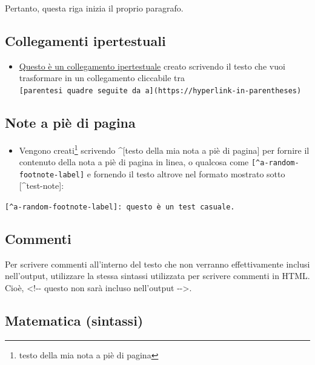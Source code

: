 \documentclass[a4paper, 11pt, nobind]{templates/ociamthesis}
\providecommand{\tightlist}{%
  \setlength{\itemsep}{0pt}\setlength{\parskip}{0pt}}
\begin{document}
Pertanto, questa riga inizia il proprio paragrafo.

\hypertarget{collegamenti-ipertestuali}{%
\subsection{Collegamenti ipertestuali}\label{collegamenti-ipertestuali}}

\begin{itemize}
\tightlist
\item
  \href{https://www.google.com}{Questo è un collegamento ipertestuale} creato scrivendo il testo che vuoi trasformare in un collegamento cliccabile tra \texttt{{[}parentesi\ quadre\ seguite\ da\ a{]}(https://hyperlink-in-parentheses)}
\end{itemize}

\hypertarget{note-a-piuxe8-di-pagina}{%
\subsection{Note a piè di pagina}\label{note-a-piuxe8-di-pagina}}

\begin{itemize}
\tightlist
\item
  Vengono creati\footnote{testo della mia nota a piè di pagina} scrivendo \^{}{[}testo della mia nota a piè di pagina{]} per fornire il contenuto della nota a piè di pagina in linea, o qualcosa come \texttt{{[}\^{}a-random-footnote-label{]}} e fornendo il testo altrove nel formato mostrato sotto {[}\^{}test-note{]}:
\end{itemize}

\texttt{{[}\^{}a-random-footnote-label{]}:\ questo\ è\ un\ test\ casuale.}

\hypertarget{commenti}{%
\subsection{Commenti}\label{commenti}}

Per scrivere commenti all'interno del testo che non verranno effettivamente inclusi nell'output, utilizzare la stessa sintassi utilizzata per scrivere commenti in HTML. Cioè, \textless!-\/- questo non sarà incluso nell'output -\/-\textgreater.

\hypertarget{matematica-sintassi}{%
\subsection{Matematica (sintassi)}\label{matematica-sintassi}}
\end{document}
